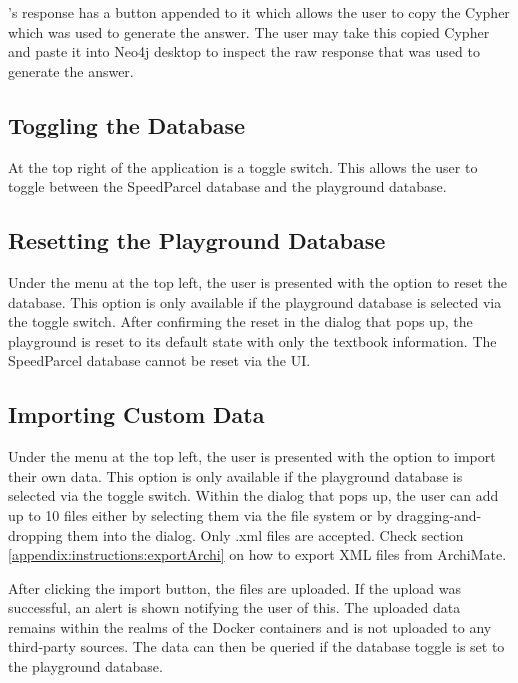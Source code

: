 \prototype's response has a button appended to it which allows the user to copy the Cypher which was used to generate the answer. The user may take this copied Cypher and paste it into Neo4j desktop to inspect the raw response that was used to generate the answer.

\subsection{Toggling the Database}
\label{appendix:instructions:toggle}
At the top right of the application is a toggle switch. This allows the user to toggle between the SpeedParcel database and the playground database.

\subsection{Resetting the Playground Database}
\label{appendix:instructions:reset_playground}
Under the menu at the top left, the user is presented with the option to reset the database. This option is only available if the playground database is selected via the toggle switch. After confirming the reset in the dialog that pops up, the playground is reset to its default state with only the textbook information. The SpeedParcel database cannot be reset via the UI.

\subsection{Importing Custom Data}
\label{appendix:instructions:import}
Under the menu at the top left, the user is presented with the option to import their own data. This option is only available if the playground database is selected via the toggle switch. Within the dialog that pops up, the user can add up to 10 files either by selecting them via the file system or by dragging-and-dropping them into the dialog. Only .xml files are accepted. Check section \ref{appendix:instructions:exportArchi} on how to export XML files from ArchiMate.

After clicking the import button, the files are uploaded. If the upload was successful, an alert is shown notifying the user of this. The uploaded data remains within the realms of the Docker containers and is not uploaded to any third-party sources. The data can then be queried if the database toggle is set to the playground database.

